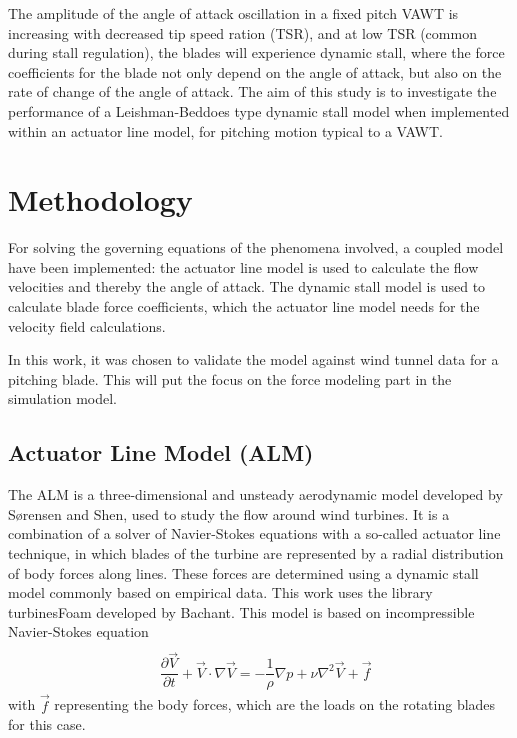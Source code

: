 \documentclass[a4paper]{jpconf}
\begin{document}
The amplitude of the angle of attack oscillation in a fixed pitch VAWT is increasing
with decreased tip speed
ration (TSR), and at low TSR (common during stall regulation), the blades will
experience dynamic stall, where the force coefficients for the blade not only
depend on the angle of attack, but also on the rate of change of the angle of
attack. The aim of this study is to investigate the performance of a
Leishman-Beddoes type dynamic stall model when implemented within an actuator
line model, for pitching motion typical to a VAWT.

\section{Methodology}
For solving the governing equations of the phenomena involved, a coupled model have
been implemented: the actuator line model is used to calculate the flow
velocities and thereby the angle of attack. The dynamic stall model is used to
calculate blade force coefficients, which the actuator line model needs for the
velocity field calculations.

In this work, it was chosen to validate the model
against wind tunnel data for a pitching blade. This will put the focus on the
force modeling part in the simulation model.

\subsection{Actuator Line Model (ALM)} 
The ALM is a three-dimensional and unsteady aerodynamic
model developed by S{\o}rensen and Shen\cite{sorensen1999computation}, used to
study the flow around wind turbines. It is a combination of a solver of
Navier-Stokes equations with a so-called actuator line technique, in which
blades of the turbine are represented by a radial distribution of body forces
along lines. These forces are determined using a dynamic stall model commonly
based on empirical data. This work uses the library turbinesFoam developed by
Bachant\cite{bachant2015simulating}. This model is based on incompressible Navier-Stokes equation
\begin{align}
 & \nonumber \\ & \dfrac{\partial \vec{V}}{\partial t} + \vec{V} \cdot \nabla \vec{V} = - \dfrac{1}{ \rho} \nabla p + \nu \nabla ^2 \vec{V} + \vec{f}	  \label{eqmom}  
\end{align} %
with $\vec{f}$ representing the body forces, which are the loads on the rotating blades for this case.
\end{document}
